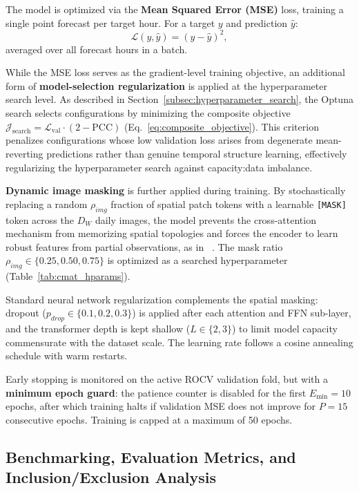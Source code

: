 The model is optimized via the \textbf{Mean Squared Error (MSE)} loss, training a single point forecast per target hour. For a target $y$ and prediction $\hat{y}$:
\begin{equation}
    \mathcal{L}(y, \hat{y}) = (y - \hat{y})^2,
\end{equation}
averaged over all forecast hours in a batch.

While the MSE loss serves as the gradient-level training objective, an additional form of \textbf{model-selection regularization} is applied at the hyperparameter search level. As described in Section~\ref{subsec:hyperparameter_search}, the Optuna search selects configurations by minimizing the composite objective $\mathcal{J}_{\text{search}} = \mathcal{L}_{\text{val}} \cdot (2 - \text{PCC})$ (Eq.~\ref{eq:composite_objective}). This criterion penalizes configurations whose low validation loss arises from degenerate mean-reverting predictions rather than genuine temporal structure learning, effectively regularizing the hyperparameter search against capacity:data imbalance.

\textbf{Dynamic image masking} is further applied during training. By stochastically replacing a random $\rho_{img}$ fraction of spatial patch tokens with a learnable \texttt{[MASK]} token across the $D_W$ daily images, the model prevents the cross-attention mechanism from memorizing spatial topologies and forces the encoder to learn robust features from partial observations, as in ~\cite{schubnel_solarcrossformer_2025}. The mask ratio $\rho_{img} \in \{0.25, 0.50, 0.75\}$ is optimized as a searched hyperparameter (Table~\ref{tab:cmat_hparams}).

Standard neural network regularization complements the spatial masking: dropout ($p_{drop} \in \{0.1, 0.2, 0.3\}$) is applied after each attention and FFN sub-layer, and the transformer depth is kept shallow ($L \in \{2, 3\}$) to limit model capacity commensurate with the dataset scale. The learning rate follows a cosine annealing schedule with warm restarts.

Early stopping is monitored on the active ROCV validation fold, but with a \textbf{minimum epoch guard}: the patience counter is disabled for the first $E_{\min} = 10$ epochs, after which training halts if validation MSE does not improve for $P = 15$ consecutive epochs. Training is capped at a maximum of 50 epochs.

\subsection{Benchmarking, Evaluation Metrics, and Inclusion/Exclusion Analysis}
\label{subsec:evaluation_ablation}

